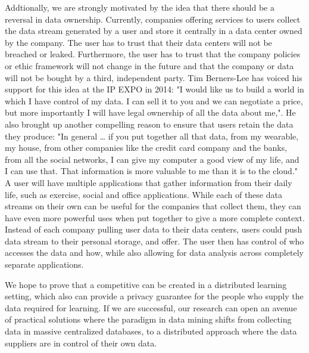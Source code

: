 Addtionally, we are strongly motivated by the idea that there should be a reversal in data ownership. Currently, companies offering services to users collect the data stream generated by a user and store it centrally in a data center owned by the company. The user has to trust that their data centers will not be breached or leaked. Furthermore, the user has to trust that the company policies or ethic framework will not change in the future and that the company or data will not be bought by a third, independent party. Tim Berners-Lee has voiced his support for this idea at the IP EXPO in 2014\cite{bernerslee2014dataownershiptelegraph}: "I would like us to build a world in which I have control of my data. I can sell it to you and we can negotiate a price, but more importantly I will have legal ownership of all the data about me,". He also brought up another compelling reason to ensure that users retain the data they produce\cite{bernerslee2014dataownershipguardian}: "In general … if you put together all that data, from my wearable, my house, from other companies like the credit card company and the banks, from all the social networks, I can give my computer a good view of my life, and I can use that. That information is more valuable to me than it is to the cloud." A user will have multiple applications that gather information from their daily life, such as exercise, social and office applications. While each of these data streams on their own can be useful for the companies that collect them, they can have even more powerful uses when put together to give a more complete context. Instead of each company pulling user data to their data centers, users could push data stream to their personal storage, and offer. The user then has control of who accesses the data and how, while also allowing for data analysis across completely separate applications.

We hope to prove that a competitive can be created in a distributed learning setting, which also can provide a privacy guarantee for the people who supply the data required for learning. If we are successful, our research can open an avenue of practical solutions where the paradigm in data mining shifts from collecting data in massive centralized databases, to a distributed approach where the data suppliers are in control of their own data.  


\cleardoublepage
